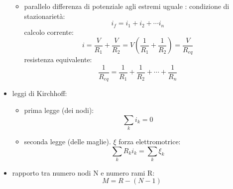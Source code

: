 \documentclass[a4paper,12pt, oneside]{book}
\begin{document}
\begin{itemize}
\begin{itemize}
		      \item parallelo differenza di potenziale agli estremi uguale :
		            condizione di stazionarietà:
		            $$i_f=i_1+i_2+\cdots i_n$$
		            calcolo corrente:
		            $$i=\frac{V}{R_1}+\frac{V}{R_2}=V\left(\frac{1}{R_1}+\frac{1}{R_2}\right)=\frac{V}{R_{eq}}$$
		            resistenza equivalente:
		            $$\frac{1}{R_{eq}}=\frac{1}{R_1}+\frac{1}{R_2}+\cdots+\frac{1}{R_n}$$
	      \end{itemize}
	\item leggi di Kirchhoff:
	      \begin{itemize}
		      \item prima legge (dei nodi):
		            $$\sum_ki_k=0$$
		      \item seconda legge (delle maglie). $\xi$ forza elettromotrice:
		            $$\sum_kR_ki_k=\sum_k\xi_k$$
	      \end{itemize}
	\item rapporto tra numero nodi N e numero rami R:
	      $$M=R-(N-1)$$
\end{itemize}
\end{document}
